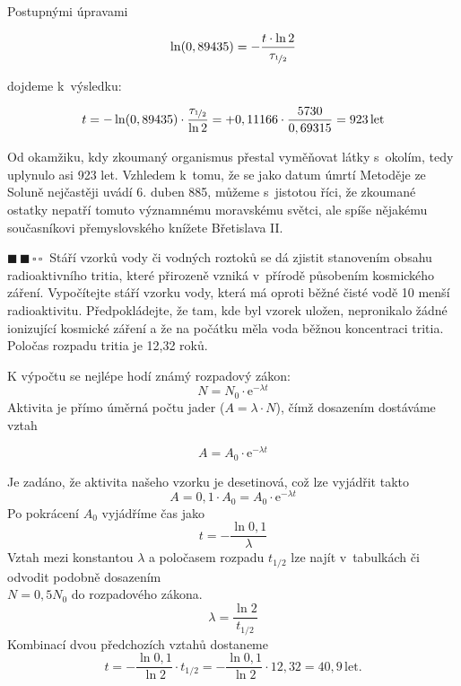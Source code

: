 \documentclass{book}
\newcommand{\dva}{$\blacksquare \, \blacksquare \, \square \, \square \; \; $}
\renewenvironment{quotation}{\par}{\par} %
\begin{document}
Postupnými úpravami

\[
\ln(0,89435)=-\frac{t\cdot\ln2}{\tau_{\nicefrac{1}{2}}}
\]

dojdeme k~výsledku: 

\[
t=-\ln(0,89435)\cdot\frac{\tau_{\nicefrac{1}{2}}}{\ln2}=+0,11166\cdot\frac{5730}{0,69315}=923\,\mathrm{let}
\]

Od okamžiku, kdy zkoumaný organismus přestal vyměňovat látky s\ okolím,
tedy uplynulo asi 923 let. Vzhledem k~tomu, že se jako datum úmrtí
Metoděje ze Soluně nejčastěji uvádí 6. duben 885, můžeme s~jistotou
říci, že zkoumané ostatky nepatří tomuto významnému moravskému světci,
ale spíše nějakému současníkovi přemyslovského knížete Břetislava
II. 

\hrulefill %
\begin{quotation}
\dva Stáří vzorků vody či vodných roztoků se dá zjistit stanovením obsahu
radioaktivního tritia, které přirozeně vzniká v~přírodě působením
kosmického záření. Vypočítejte stáří vzorku vody, která má oproti
běžné čisté vodě 10\texttimes{} menší radioaktivitu. Předpokládejte,
že tam, kde byl vzorek uložen, nepronikalo žádné ionizující kosmické
záření a že na počátku měla voda běžnou koncentraci tritia. Poločas
rozpadu tritia je 12,32 roků.
\end{quotation} \dotfill \par 
K výpočtu se nejlépe hodí známý rozpadový zákon: 
\[
N=N_{0}\cdot\mathrm{e}^{-\lambda t}
\]
Aktivita je přímo úměrná počtu jader ($A=\lambda\cdot N$), čímž dosazením
dostáváme vztah 

\[
A=A_{0}\cdot\mathrm{e}^{-\lambda t} 
\]

Je zadáno, že aktivita našeho vzorku je desetinová, což lze vyjádřit
takto 
\[
A=0,1\cdot A_{0}=A_{0}\cdot\mathrm{e}^{-\lambda t}
\]
Po pokrácení $A_{0}$ vyjádříme čas jako 
\[
t=-\frac{\ln0,1}{\lambda}
\]
Vztah mezi konstantou $\lambda$ a poločasem rozpadu $t_{1/2}$ lze
najít v~tabulkách či odvodit podobně dosazením\\ 
$N=0,5N_{0}$ do rozpadového zákona.
\[
\lambda=\frac{\ln2}{t_{1/2}}
\]
Kombinací dvou předchozích vztahů dostaneme
\[
t= - \frac{\ln 0,1}{\ln2}\cdot t_{1/2}=-\frac{\ln 0,1}{\ln 2} \cdot 12,32=40,9 \, \mathrm{let.}
\]
\end{document}
